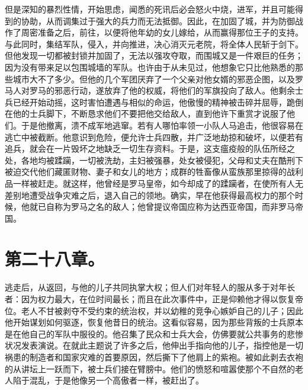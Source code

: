 但是深知的暴烈性情，开始思虑，闻悉的死讯后必会怒火中烧，进军，并且可能得到的协助，从而调集过于强大的兵力而无法抵御。因此，在加固了城，并为防御战作了周密准备之后，前往，以便将他年幼的女儿嫁给，从而赢得那位王子的支持。与此同时，集结军队，侵入，并向推进，决心消灭元老院，将全体人民斩于剑下。但他发现一切都被封锁并加固了，无法以强攻夺取，而围城又是一件艰巨的任务；因为没有带来足以包围城墙的军队。也许由于从未见过，他想象它只比他熟悉的那些城市大不了多少。但他的几个军团厌弃了一个父亲对他女婿的邪恶企图，以及罗马人对罗马的邪恶行动，遂放弃了他的权威，将他们的军旗投向了敌人。他剩余士兵已经开始动摇，这时害怕遭遇与相似的命运，他傲慢的精神被击碎并屈辱，跪倒在他的士兵脚下，不断恳求他们不要把他交给敌人，直到他许下重赏才说服了他们。于是他撤离，溃不成军地逃窜。若有人哪怕率领一小队人马追击，他很容易在逃亡中被截断。他意识到危险，便允许士兵四散，并广泛地劫掠和破坏，以便若有追兵，就会在一片毁坏之地缺乏一切生存资料。于是，这支瘟疫般的队伍所经之处，各地均被蹂躏，一切被洗劫，主妇被强暴，处女被侵犯，父母和丈夫在酷刑下被迫交代他们藏匿财物、妻子和女儿的地方；成群的牲畜像从蛮族那里掠得的战利品一样被赶走。就这样，他曾经是罗马皇帝，如今却成了的蹂躏者，在使所有人无差别地遭受战争灾难之后，退入自己的领地。确实，早在他获得最高权力的那个时候，他就已自称为罗马之名的敌人；他曾提议帝国应称为达西亚帝国，而非罗马帝国。\par


\section{第二十八章。}

逃走后，从返回，与他的儿子共同执掌大权；但人们对年轻人的服从多于对年长者：因为权力最大，在位时间最长；而且在此次事件中，正是仰赖他才得以恢复帝位。老人不甘被剥夺不受约束的统治权，并以幼稚的竞争心嫉妒自己的儿子；因此他开始谋划如何驱逐，恢复他昔日的统治。这看似容易，因为那些背叛的士兵原本是在他自己的军队中服役的。他召集了民众和士兵大会，仿佛要就公共事务的悲惨状况发表演说。在就此主题说了许多之后，他伸出手指向他的儿子，指控他是一切祸患的制造者和国家灾难的首要原因，然后撕下了他肩上的紫袍。被如此剥去衣袍的从讲坛上一跃而下，被士兵们接在臂膀中。他们的愤怒和喧嚣使那个不自然的老人陷于混乱，于是他像另一个高傲者一样，被赶出了。\par

